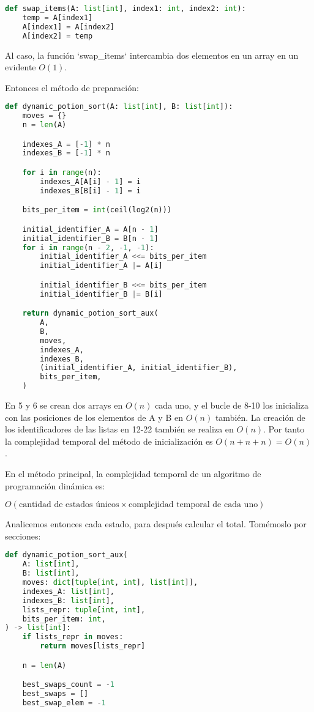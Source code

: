 \documentclass{article}
\begin{document}
\begin{lstlisting}[language=Python]
def swap_items(A: list[int], index1: int, index2: int):
    temp = A[index1]
    A[index1] = A[index2]
    A[index2] = temp
\end{lstlisting}

Al caso, la función `swap_items` intercambia dos elementos en un array en un evidente $O(1)$.

Entonces el método de preparación:

\begin{lstlisting}[language=Python]
def dynamic_potion_sort(A: list[int], B: list[int]):
    moves = {}
    n = len(A)

    indexes_A = [-1] * n
    indexes_B = [-1] * n

    for i in range(n):
        indexes_A[A[i] - 1] = i
        indexes_B[B[i] - 1] = i

    bits_per_item = int(ceil(log2(n)))

    initial_identifier_A = A[n - 1]
    initial_identifier_B = B[n - 1]
    for i in range(n - 2, -1, -1):
        initial_identifier_A <<= bits_per_item
        initial_identifier_A |= A[i]

        initial_identifier_B <<= bits_per_item
        initial_identifier_B |= B[i]

    return dynamic_potion_sort_aux(
        A,
        B,
        moves,
        indexes_A,
        indexes_B,
        (initial_identifier_A, initial_identifier_B),
        bits_per_item,
    )
\end{lstlisting}

En 5 y 6 se crean dos arrays en $O(n)$ cada uno, y el bucle de 8-10 los inicializa con las posiciones de los elementos de A y B en $O(n)$ también. La creación de los identificadores de las listas en 12-22 también se realiza en $O(n)$. Por tanto la complejidad temporal del método de inicialización es $O(n + n + n) = O(n)$.

En el método principal, la complejidad temporal de un algoritmo de programación dinámica es:

$O(\text{cantidad de estados únicos} \times \text{complejidad temporal de cada uno})$

Analicemos entonces cada estado, para después calcular el total. Tomémoslo por secciones:

\begin{lstlisting}[language=Python]
def dynamic_potion_sort_aux(
    A: list[int],
    B: list[int],
    moves: dict[tuple[int, int], list[int]],
    indexes_A: list[int],
    indexes_B: list[int],
    lists_repr: tuple[int, int],
    bits_per_item: int,
) -> list[int]:
    if lists_repr in moves:
        return moves[lists_repr]

    n = len(A)

    best_swaps_count = -1
    best_swaps = []
    best_swap_elem = -1
\end{lstlisting}
\end{document}
